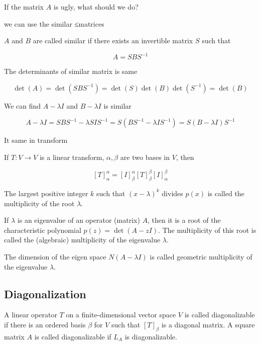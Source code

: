\begin{rmk*} $ $

	If the matrix $A$ is ugly, what should we do?
	
	we can use the similar ≤matrices
	
	$A$ and $B$ are called similar if there exists an invertible matrix $S$ such that 
	
	$$ A = SBS^{-1}$$
	
	The determinants of similar matrix is same
	
	$$\det(A) = \det(SBS^{-1}) = \det(S)\det(B)\det(S^{-1}) = \det(B)$$
	
	We can find $A-\lambda I$ and $B -\lambda I$ is similar
	
	$$A - \lambda I = SBS^{-1} - \lambda SIS^{-1} = S(BS^{-1} - \lambda I S^{-1}) = S(B-\lambda I)S^{-1}$$
	
	It same in transform
	
	If $T:V\rightarrow V$ is a linear transform, $\alpha,\beta$ are two bases in $V$, then
	
	$$[T]^{\alpha}_{\alpha} = [I]^{\alpha}_{\beta}[T]^{\beta}_{\beta}[I]^{\beta}_{\alpha} $$
	
	
\end{rmk*}

\begin{defn}
	The largest positive integer $k$ such that $(x - \lambda)^k$ divides $p(x)$ is called the multiplicity of the root $\lambda$.
	
	If $\lambda$ is an eigenvalue of an operator (matrix) $A$, then it is a root of the characteristic polynomial $p(z) = \det(A - zI)$. The multiplicity of this root is called the (algebraic) multiplicity of the eigenvalue $\lambda$.
\end{defn}

\begin{defn}
	The dimension of the eigen space $N(A - \lambda I)$ is called geometric multiplicity of the eigenvalue $\lambda$.
\end{defn}

\subsection{Diagonalization}

\begin{defn}
	A linear operator $T$ on a finite-dimensional vector space $V$ is called diagonalizable if there is an ordered basis $\beta$ for $V$ such that $[T]_{\beta}$ is a diagonal matrix. A square matrix $A$ is called diagonalizable if $L_A$ is diagonalizable.
\end{defn}

